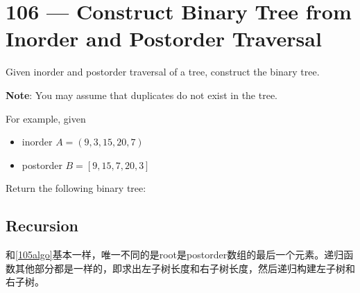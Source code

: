 \section{106 --- Construct Binary Tree from Inorder and Postorder Traversal}
Given inorder and postorder traversal of a tree, construct the binary tree.
\par
\textbf{Note}: You may assume that duplicates do not exist in the tree.
\par
For example, given
\begin{itemize}
    \item inorder $ A = (9,3,15,20,7)$
    \item postorder $ B = [9,15,7,20,3]$
\end{itemize}
Return the following binary tree:
\begin{figure}[H]
\end{figure}
\subsection{Recursion}
\begin{CJK*}{UTF8}{gbsn}
和\ref{105algo}基本一样，唯一不同的是root是postorder数组的最后一个元素。递归函数其他部分都是一样的，即求出左子树长度和右子树长度，然后递归构建左子树和右子树。
\end{CJK*}
